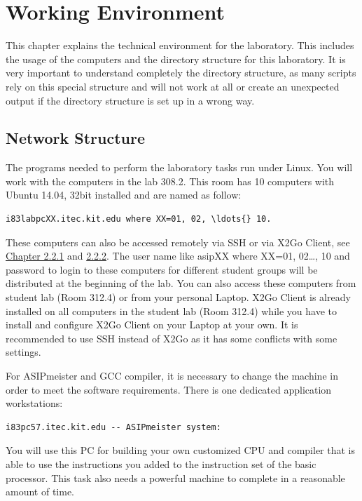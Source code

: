 \hypertarget{working-environment}{%
\chapter{Working Environment}\label{working-environment}}
This chapter explains the technical environment for the laboratory. This
includes the usage of the computers and the directory structure for this
laboratory. It is very important to understand completely the directory
structure, as many scripts rely on this special structure and will not
work at all or create an unexpected output if the directory structure is
set up in a wrong way.
\hypertarget{network-structure}{%
\section{Network Structure}\label{network-structure}}
The programs needed to perform the laboratory tasks run under Linux. You
will work with the computers in the lab 308.2. This room has 10
computers with Ubuntu 14.04, 32bit installed and are named as follow:
\begin{lstlisting}
i83labpcXX.itec.kit.edu where XX=01, 02, \ldots{} 10.
\end{lstlisting}
These computers can also be accessed remotely via SSH or via X2Go
Client, see \protect\hyperlink{remote-operation}{Chapter 2.2.1} and
\protect\hyperlink{x2go-client}{2.2.2}. The user name like asipXX where
XX=01, 02\ldots, 10 and password to login to these computers for
different student groups will be distributed at the beginning of the
lab. You can also access these computers from student lab (Room 312.4)
or from your personal Laptop. X2Go Client is already installed on all
computers in the student lab (Room 312.4) while you have to install and
configure X2Go Client on your Laptop at your own. It is recommended to
use SSH instead of X2Go as it has some conflicts with some settings.

For ASIPmeister and GCC compiler, it is necessary to change the machine
in order to meet the software requirements. There is one dedicated
application workstations:
\begin{lstlisting}
i83pc57.itec.kit.edu -- ASIPmeister system:
\end{lstlisting}
You will use this PC for building your own customized CPU and compiler
that is able to use the instructions you added to the instruction set of
the basic processor. This task also needs a powerful machine to complete
in a reasonable amount of time.

